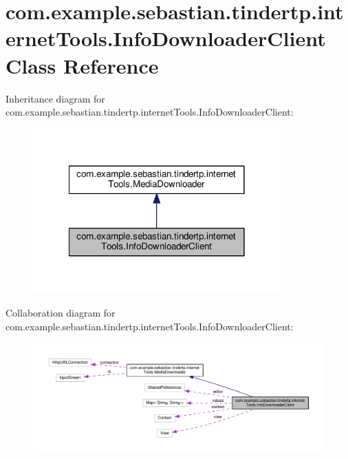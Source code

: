 \hypertarget{classcom_1_1example_1_1sebastian_1_1tindertp_1_1internetTools_1_1InfoDownloaderClient}{}\section{com.\+example.\+sebastian.\+tindertp.\+internet\+Tools.\+Info\+Downloader\+Client Class Reference}
\label{classcom_1_1example_1_1sebastian_1_1tindertp_1_1internetTools_1_1InfoDownloaderClient}


Inheritance diagram for com.\+example.\+sebastian.\+tindertp.\+internet\+Tools.\+Info\+Downloader\+Client\+:\nopagebreak
\begin{figure}[H]
\begin{center}
\leavevmode
\includegraphics[width=270pt]{classcom_1_1example_1_1sebastian_1_1tindertp_1_1internetTools_1_1InfoDownloaderClient__inherit__graph}
\end{center}
\end{figure}


Collaboration diagram for com.\+example.\+sebastian.\+tindertp.\+internet\+Tools.\+Info\+Downloader\+Client\+:\nopagebreak
\begin{figure}[H]
\begin{center}
\leavevmode
\includegraphics[width=350pt]{classcom_1_1example_1_1sebastian_1_1tindertp_1_1internetTools_1_1InfoDownloaderClient__coll__graph}
\end{center}
\end{figure}
